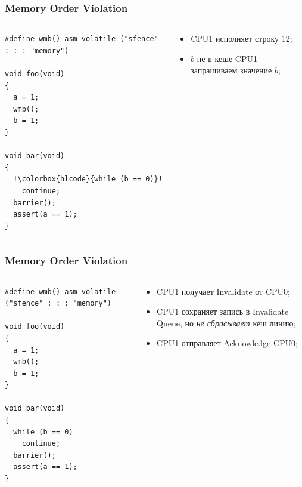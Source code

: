\begin{frame}[fragile]
\frametitle{Memory Order Violation}

\begin{columns}[T]
  \begin{column}{.4\linewidth}
    \begin{lstlisting}[escapechar=!]
#define wmb() asm volatile ("sfence" : : : "memory")

void foo(void)
{
  a = 1;
  wmb();
  b = 1;
}

void bar(void)
{
  !\colorbox{hlcode}{while (b == 0)}!
    continue;
  barrier();
  assert(a == 1);
}
    \end{lstlisting}
  \end{column}
  \begin{column}{.6\linewidth}
    \begin{itemize}
      \item CPU1 исполняет строку 12;
      \item $b$ не в кеше CPU1 - запрашиваем значение $b$;
    \end{itemize}
  \end{column}
\end{columns}
\end{frame}

\begin{frame}[fragile]
\frametitle{Memory Order Violation}

\begin{columns}[T]
  \begin{column}{.4\linewidth}
    \begin{lstlisting}[escapechar=!]
#define wmb() asm volatile ("sfence" : : : "memory")

void foo(void)
{
  a = 1;
  wmb();
  b = 1;
}

void bar(void)
{
  while (b == 0)
    continue;
  barrier();
  assert(a == 1);
}
    \end{lstlisting}
  \end{column}
  \begin{column}{.6\linewidth}
    \begin{itemize}
      \item CPU1 получает Invalidate от CPU0;
      \item CPU1 сохраняет запись в Invalidate Queue, но \emph{не сбрасывает}
            кеш линию;
      \item CPU1 отправляет Acknowledge CPU0;
    \end{itemize}
  \end{column}
\end{columns}
\end{frame}

